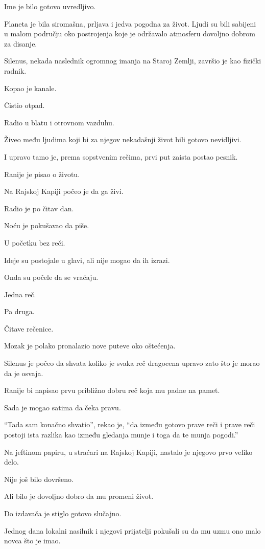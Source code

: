 Ime je bilo gotovo uvredljivo.

Planeta je bila siromašna, prljava i jedva pogodna za život. Ljudi su bili sabijeni u malom području oko postrojenja koje je održavalo atmosferu dovoljno dobrom za disanje.

Silenus, nekada naslednik ogromnog imanja na Staroj Zemlji, završio je kao fizički radnik.

Kopao je kanale.

Čistio otpad.

Radio u blatu i otrovnom vazduhu.

Živeo među ljudima koji bi za njegov nekadašnji život bili gotovo nevidljivi.

I upravo tamo je, prema sopstvenim rečima, prvi put zaista postao pesnik.

Ranije je pisao o životu.

Na Rajskoj Kapiji počeo je da ga živi.

Radio je po čitav dan.

Noću je pokušavao da piše.

U početku bez reči.

Ideje su postojale u glavi, ali nije mogao da ih izrazi.

Onda su počele da se vraćaju.

Jedna reč.

Pa druga.

Čitave rečenice.

Mozak je polako pronalazio nove puteve oko oštećenja.

Silenus je počeo da shvata koliko je svaka reč dragocena upravo zato što je morao da je osvaja.

Ranije bi napisao prvu približno dobru reč koja mu padne na pamet.

Sada je mogao satima da čeka pravu.

``Tada sam konačno shvatio'', rekao je, ``da između gotovo prave reči i prave reči postoji ista razlika kao između gledanja munje i toga da te munja pogodi.''

Na jeftinom papiru, u straćari na Rajskoj Kapiji, nastalo je njegovo prvo veliko delo.

Nije još bilo dovršeno.

Ali bilo je dovoljno dobro da mu promeni život.

\bigskip

Do izdavača je stiglo gotovo slučajno.

Jednog dana lokalni nasilnik i njegovi prijatelji pokušali su da mu uzmu ono malo novca što je imao.

